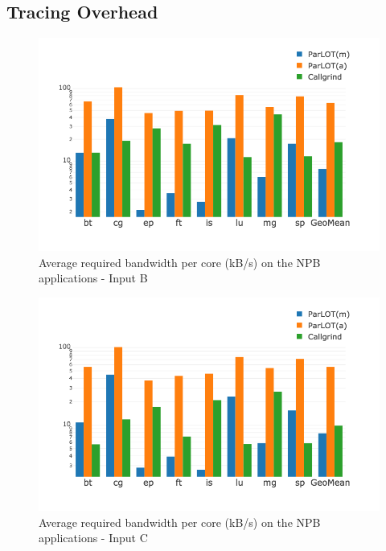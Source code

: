 
\subsection{Tracing Overhead}
\label{subsec:lowtoh}


\begin{figure}[b]
\centering
\includegraphics[width=.75\textwidth]{parlot/figs.comet.newMed/comet_chartAvg_bw_B_p3_5.png}
\caption{  Average required bandwidth per core (kB/s) on the NPB applications - Input B}
\label{comet_chartAvg_bw_B_p3_5}
\end{figure}

\begin{figure}[t]
\centering
\includegraphics[width=.75\textwidth]{parlot/figs.comet.newMed/comet_chartAvg_bw_C_p3_5.png}
\caption{ Average required bandwidth per core (kB/s) on the NPB applications - Input C}
\label{comet_chartAvg_bw_C_p3_5}
\end{figure}


